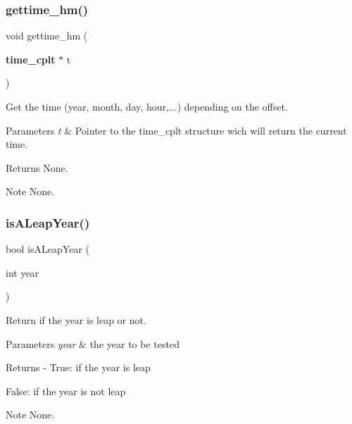 \subsubsection{gettime\_hm()}
{\footnotesize\ttfamily void gettime\+\_\+hm (\begin{DoxyParamCaption}\item[{\textbf{ time\+\_\+cplt} $\ast$}]{t }\end{DoxyParamCaption})}



Get the time (year, month, day, hour,...) depending on the offset. 


\begin{DoxyParams}{Parameters}
{\em t} & Pointer to the time\+\_\+cplt structure wich will return the current time.\\
\hline
\end{DoxyParams}
\begin{DoxyReturn}{Returns}
None.
\end{DoxyReturn}
\begin{DoxyNote}{Note}
None. 
\end{DoxyNote}
\mbox{\label{time__hm_8c_a99a092165ba432f4205c2b38221cc3fa}} 
\subsubsection{isALeapYear()}
{\footnotesize\ttfamily bool is\+A\+Leap\+Year (\begin{DoxyParamCaption}\item[{int}]{year }\end{DoxyParamCaption})}



Return if the year is leap or not. 


\begin{DoxyParams}{Parameters}
{\em year} & the year to be tested\\
\hline
\end{DoxyParams}
\begin{DoxyReturn}{Returns}
-\/ True\+: if the year is leap
\begin{DoxyItemize}
\item False\+: if the year is not leap
\end{DoxyItemize}
\end{DoxyReturn}
\begin{DoxyNote}{Note}
None. 
\end{DoxyNote}
\mbox{\label{time__hm_8c_a7cae5e3ee1050b12a5ec070daa05866c}} 
